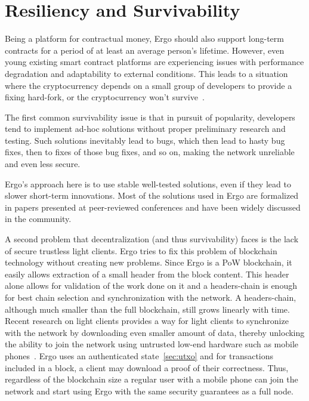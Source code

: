 \section{Resiliency and Survivability}
\label{sec:survivability}

Being a platform for contractual money, Ergo should also support long-term contracts for a period of at least an average person's lifetime.
However, even young existing smart contract platforms are experiencing issues with performance degradation and adaptability to external conditions.
This leads to a situation where the cryptocurrency depends on a small group of developers to provide a fixing hard-fork, or the cryptocurrency won't survive~\cite{???}.

The first common survivability issue is that in pursuit of popularity, developers tend to implement ad-hoc solutions without proper preliminary research and testing.
Such solutions inevitably lead to bugs, which then lead to hasty bug fixes, then to fixes of those bug fixes, and so on, making the network unreliable and even less secure. 

Ergo's approach here is to use stable well-tested solutions, even if they lead to slower short-term innovations.
Most of the solutions used in Ergo are formalized in papers presented at peer-reviewed conferences and have been widely discussed in the community.

A second problem that decentralization (and thus survivability) faces is the lack of secure trustless light clients. Ergo tries to fix this problem of blockchain technology without creating new problems. Since Ergo is a PoW blockchain, it easily allows extraction of a small header from the block content.
This header alone allows for validation of the work done on it and a headers-chain is enough for best chain selection and synchronization with the network.
A headers-chain, although much smaller than the full blockchain, still grows linearly with time.
Recent research on light clients provides a way for light clients to synchronize with the network by downloading even smaller amount of data, thereby unlocking the ability to join the network using untrusted low-end hardware such as mobile phones~\cite{kiayias2017non,luuflyclient}.
Ergo uses an authenticated state~\ref{sec:utxo} and for transactions included in a block, a client may download a proof of their correctness.
Thus, regardless of the blockchain size a regular user with
a mobile phone can join the network and start using Ergo with the same security
guarantees as a full node.

